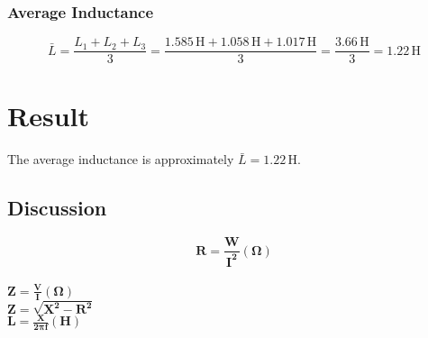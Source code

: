 \documentclass[a4paper,12pt]{article}
\begin{document}
\subsubsection{Average Inductance}



\[
\bar{L} = \frac{L_1 + L_2 + L_3}{3} = \frac{1.585\,\text{H} + 1.058\,\text{H} + 1.017\,\text{H}}{3} = \frac{3.66\,\text{H}}{3} = 1.22\,\text{H}
\]
\section{Result}

 The average inductance is approximately \( \bar{L} = 1.22\,\text{H} \). 
\subsection{Discussion}




$$\boldsymbol{ R = \frac{W}{I^{2}}(\Omega)}$$ \\

$\boldsymbol{Z = \frac{V}{I}(\Omega)} $ \\

$\boldsymbol{ Z = \sqrt{X^{2}-R^{2}}}$\\

$ \boldsymbol{L = \frac{X}{2 \pi f}(H)}$\\
\end{document}
